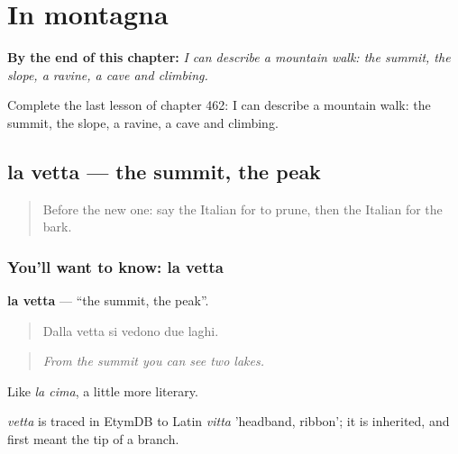 
\chapter{In montagna}
\label{ch:it-in-montagna}

\begin{chapteropening}
\textbf{By the end of this chapter:} \emph{I can describe a mountain walk: the summit, the slope, a ravine, a cave and climbing.}

Complete the last lesson of chapter 462: I can describe a mountain walk: the summit, the slope, a ravine, a cave and climbing.
\end{chapteropening}

\section[la vetta]{la vetta — the summit, the peak}

\label{lesson:IT-C462-vetta}



\begin{quote}
Before the new one: say the Italian for to prune, then the Italian for the bark.
\end{quote}

\subsection*{You'll want to know: la vetta}
\textbf{la vetta} — \textquotedblleft{}the summit, the peak\textquotedblright{}.

\begin{quote}
Dalla vetta si vedono due laghi.
\end{quote}

\begin{quote}
\emph{From the summit you can see two lakes.}
\end{quote}

Like \emph{la cima}, a little more literary.

\begin{cousinweb}
\emph{vetta} is traced in EtymDB to Latin \emph{vitta} 'headband, ribbon'; it is inherited, and first meant the tip of a branch.
\end{cousinweb}

